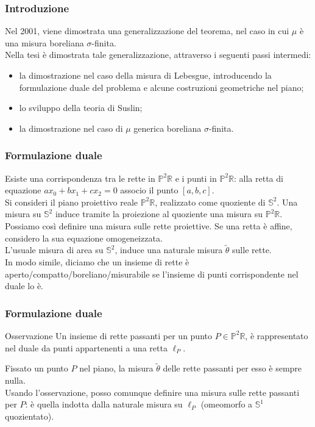 \documentclass[11pt]{beamer} %
\newcommand{\R}{\mathbb{R}}
\renewcommand{\S}{\mathbb{S}}
\renewcommand{\P}{\mathbb{P}}
\newcommand{\<}{\langle}
\renewcommand{\>}{\rangle}
\theoremstyle{theorem}
\theoremstyle{theorem}
\theoremstyle{theorem}
\theoremstyle{theorem}
\theoremstyle{theorem}
\begin{document}
\begin{frame}[fragile]
\frametitle{Introduzione}	
		Nel 2001, viene dimostrata una generalizzazione del teorema, nel caso in cui $\mu$ è una misura boreliana $\sigma$-finita.\\
		Nella tesi è dimostrata tale generalizzazione, attraverso i seguenti passi intermedi: \pause
		\begin{itemize}
			\item la dimostrazione nel caso della misura di Lebesgue, introducendo la formulazione duale del problema e alcune costruzioni geometriche nel piano;\\ \pause
			\item lo sviluppo della teoria di Suslin;\\ \pause
			\item la dimostrazione nel caso di $\mu$ generica boreliana $\sigma$-finita.
		\end{itemize}
\end{frame}

\begin{frame}[fragile]
	\frametitle{Formulazione duale}
	Esiste una corrispondenza tra le rette in $\P^2 \R$ e i punti in $\P^2\R$: alla retta di equazione $ax_0+bx_1+cx_2=0$ associo il punto $[a,b,c]$.\\
	\pause
	Si consideri il piano proiettivo reale $\P^2 \R$, realizzato come quoziente di $\S^2$. Una misura su $\S^2$ induce tramite la proiezione al quoziente una misura su $\P^2\R$.\\
	\pause
	Possiamo così definire una misura sulle rette proiettive. Se una retta è affine, considero la sua equazione omogeneizzata.\\
	L'usuale misura di area su $\S^2$, induce una naturale misura $\tilde \theta$ sulle rette.\\
	\pause
	In modo simile, diciamo che un insieme di rette è aperto/compatto/boreliano/misurabile se l'insieme di punti corrispondente nel duale lo è.	
\end{frame}

\begin{frame}
	\frametitle{Formulazione duale}
	
	\begin{block}{Osservazione}
		Un insieme di rette passanti per un punto $P \in \P^2 \R$, è rappresentato nel duale da punti appartenenti a una retta $\ell_P$.\\
	\end{block}
	\pause
	\medskip
	Fissato un punto $P$ nel piano, la misura $\tilde \theta$ delle rette passanti per esso è sempre nulla.\\
	\pause
	Usando l'osservazione, posso comunque definire una misura sulle rette passanti per $P$: è quella indotta dalla naturale misura su $\ell_P$ (omeomorfo a $\S^1$ quozientato).\\
\end{frame}	
\end{document}
